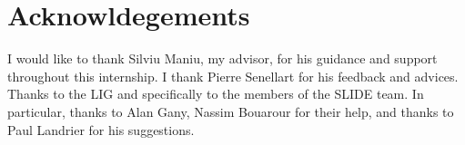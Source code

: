 \documentclass[twocolumn]{../cs-classes/cs-classes}
\newcommand*{\1}{\digitsbb{1}}
\newcommand*{\0}{\digitsbb{0}}
\begin{document}
\section*{Acknowldegements}
I would like to thank Silviu Maniu, my advisor, for his guidance and support throughout this internship. I thank Pierre Senellart for his feedback and advices. Thanks to the LIG and specifically to the members of the SLIDE team. In particular, thanks to Alan Gany, Nassim Bouarour for their help, and thanks to Paul Landrier for his suggestions.

\nocite{*}
\printbibliography

\newpage

\begingroup
\hypersetup{hidelinks}
\tableofcontents
\newpage
\listoffigures
\endgroup

\appendix
\end{document}
